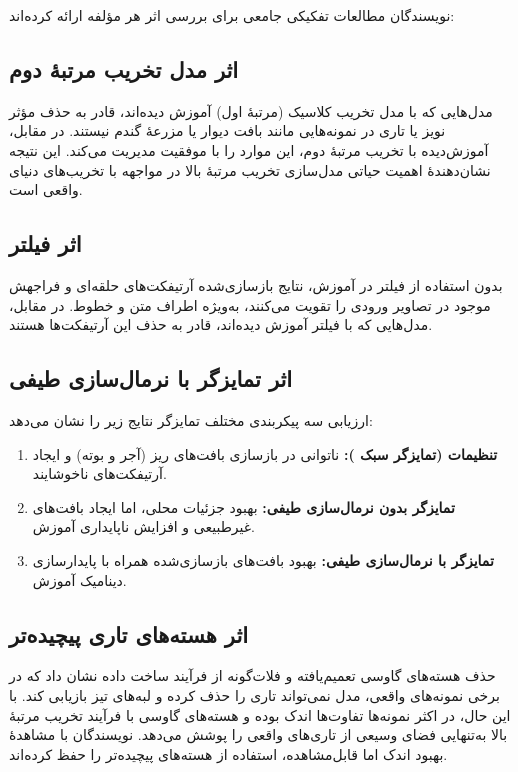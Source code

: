 نویسندگان مطالعات تفکیکی جامعی برای بررسی اثر هر مؤلفه ارائه کرده‌اند:

\subsection{اثر مدل تخریب مرتبهٔ دوم}
مدل‌هایی که با مدل تخریب کلاسیک (مرتبهٔ اول) آموزش دیده‌اند، قادر به حذف مؤثر نویز یا تاری در نمونه‌هایی مانند بافت دیوار یا مزرعهٔ گندم نیستند. در مقابل،  آموزش‌دیده با تخریب مرتبهٔ دوم، این موارد را با موفقیت مدیریت می‌کند. این نتیجه نشان‌دهندهٔ اهمیت حیاتی مدل‌سازی تخریب مرتبهٔ بالا در مواجهه با تخریب‌های دنیای واقعی است.

\subsection{اثر فیلتر }
بدون استفاده از فیلتر  در آموزش، نتایج بازسازی‌شده آرتیفکت‌های حلقه‌ای و فراجهش موجود در تصاویر ورودی را تقویت می‌کنند، به‌ویژه اطراف متن و خطوط. در مقابل، مدل‌هایی که با فیلتر  آموزش دیده‌اند، قادر به حذف این آرتیفکت‌ها هستند.
\subsection{اثر تمایزگر  با نرمال‌سازی طیفی}
ارزیابی سه پیکربندی مختلف تمایزگر نتایج زیر را نشان می‌دهد:
\begin{enumerate}
	\item \textbf{تنظیمات  (تمایزگر سبک ):} ناتوانی در بازسازی بافت‌های ریز (آجر و بوته) و ایجاد آرتیفکت‌های ناخوشایند.
	\item \textbf{تمایزگر  بدون نرمال‌سازی طیفی:} بهبود جزئیات محلی، اما ایجاد بافت‌های غیرطبیعی و افزایش ناپایداری آموزش.
	\item \textbf{تمایزگر  با نرمال‌سازی طیفی:} بهبود بافت‌های بازسازی‌شده همراه با پایدارسازی دینامیک آموزش.
\end{enumerate}

\subsection{اثر هسته‌های تاری پیچیده‌تر}
حذف هسته‌های گاوسی تعمیم‌یافته و فلات‌گونه از فرآیند ساخت داده نشان داد که در برخی نمونه‌های واقعی، مدل نمی‌تواند تاری را حذف کرده و لبه‌های تیز بازیابی کند. با این حال، در اکثر نمونه‌ها تفاوت‌ها اندک بوده و هسته‌های گاوسی با فرآیند تخریب مرتبهٔ بالا به‌تنهایی فضای وسیعی از تاری‌های واقعی را پوشش می‌دهد. نویسندگان با مشاهدهٔ بهبود اندک اما قابل‌مشاهده، استفاده از هسته‌های پیچیده‌تر را حفظ کرده‌اند.


